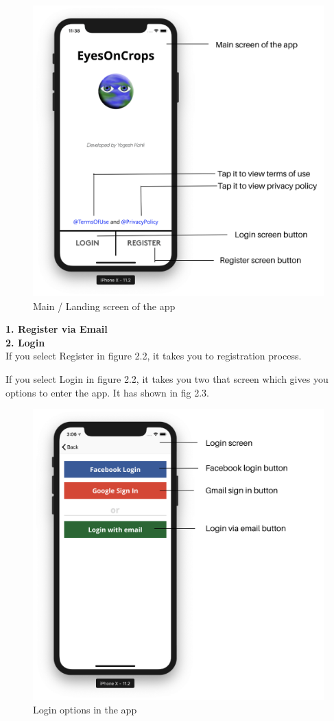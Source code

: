 \begin{itemize}
       \begin{figure}[H]
            \centering
            \includegraphics[width=0.50\linewidth]{figures/ch2/main_screen.png}
            \caption{\label{fig:main_screen} Main / Landing screen of the app}
        \end{figure}

    \textbf{1. Register via Email} \\
    \textbf{2. Login} \\
    
    If you select Register in figure 2.2, it takes you to registration process.
    
    
    
    
    
    If you select Login in figure 2.2, it takes you two that screen which gives you options to enter the app. It has shown in fig 2.3.
    
    \begin{figure}[H]
            \centering
            \includegraphics[width=0.50\linewidth]{figures/ch2/loginOptions.png}
            \caption{\label{fig:main_screen} Login options in the app}
    \end{figure}
    

\end{itemize}
